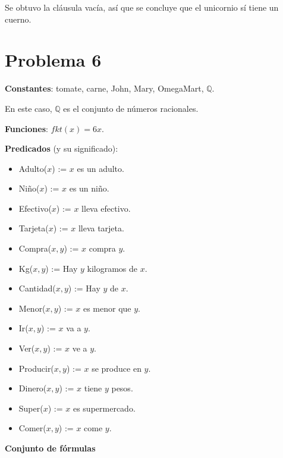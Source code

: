 \documentclass{article}
\begin{document}
Se obtuvo la cláusula vacía, así que se concluye que el unicornio sí tiene un cuerno.

\section*{Problema 6}

\textbf{Constantes}: tomate, carne, John, Mary, OmegaMart, $\mathbb{Q}$.

En este caso, $\mathbb{Q}$ es el conjunto de números racionales.

\textbf{Funciones}: $fkt(x) = 6x$.

\textbf{Predicados} (y su significado):

\begin{itemize}
\item Adulto($x$) := $x$ es un adulto.
\item Niño($x$) := $x$ es un niño.
\item Efectivo($x$) := $x$ lleva efectivo.
\item Tarjeta($x$) := $x$ lleva tarjeta.
\item Compra($x, y$) := $x$ compra $y$.
\item Kg($x, y$) := Hay $y$ kilogramos de $x$.
\item Cantidad($x, y$) := Hay $y$ de $x$.
\item Menor($x, y$) := $x$ es menor que $y$.
\item Ir($x, y$) := $x$ va a $y$.
\item Ver($x, y$) := $x$ ve a $y$.
\item Producir($x, y$) := $x$ se produce en $y$.
\item Dinero($x, y$) := $x$ tiene $y$ pesos.
\item Super($x$) := $x$ es supermercado.
\item Comer($x, y$) := $x$ come $y$.
\end{itemize}

\textbf{Conjunto de fórmulas}
\end{document}
